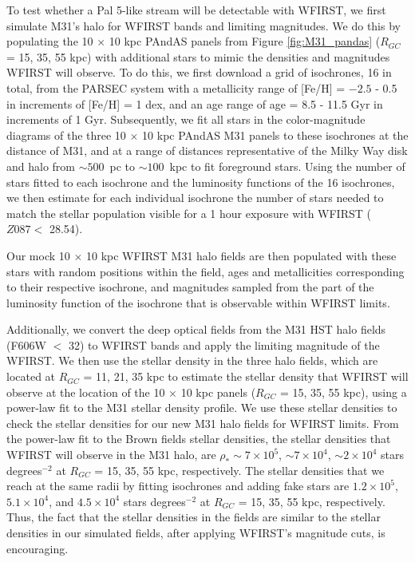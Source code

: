 \documentclass[twocolumn]{aastex62}
\begin{document}
To test whether a Pal 5-like stream will be detectable with WFIRST, we first simulate M31's halo for WFIRST bands and limiting magnitudes. We do this by populating the 10 $\times$ 10 kpc PAndAS panels from Figure \ref{fig:M31_pandas} ($R_{GC}$ = 15, 35, 55 kpc) with additional stars to mimic the densities and magnitudes WFIRST will observe. To do this, we first download a grid of isochrones, 16 in total, from the PARSEC system with a metallicity range of [Fe/H] = $-2.5$ - 0.5 in increments of [Fe/H] = 1 dex, and an age range of age = 8.5 - 11.5 Gyr in increments of 1 Gyr. Subsequently, we fit all stars in the color-magnitude diagrams of the three 10 $\times$ 10 kpc  PAndAS M31 panels to these isochrones at the distance of M31, and at a range of distances representative of the Milky Way disk and halo from ${\sim}500$~pc to ${\sim}100$~kpc to fit foreground stars. Using the number of stars fitted to each isochrone and the luminosity functions of the 16 isochrones, we then estimate  for each individual isochrone the number of stars needed to match the stellar population visible for a 1 hour exposure with WFIRST ($Z087 <$ 28.54).

Our mock 10 $\times$ 10 kpc WFIRST M31 halo fields are then populated with these stars with random positions within the field, ages and metallicities corresponding to their respective isochrone, and magnitudes sampled from the part of the luminosity function of the isochrone that is observable within WFIRST limits.

Additionally, we convert the deep optical fields from the \citet{brown09} M31 HST halo fields (F606W $<$ 32) to WFIRST bands and apply the limiting magnitude of the WFIRST. We then use the stellar density in the three \citet{brown09} halo fields, which are located at $R_{GC}$ = 11, 21, 35 kpc to estimate the stellar density that WFIRST will observe at the location of the 10 $\times$ 10 kpc panels ($R_{GC}$ = 15, 35, 55 kpc), using a power-law fit to the M31 stellar density profile. We use these stellar densities to check the stellar densities for our new M31 halo fields for WFIRST limits. From the power-law fit to the Brown fields stellar densities, the stellar densities that WFIRST will observe in the M31 halo, are $\rho_*  \sim 7 \times 10^5$,  ${\sim}7 \times 10^4$,  ${\sim} 2 \times 10^4$ stars degrees$^{-2}$ at  $R_{GC}$ = 15, 35, 55 kpc, respectively. The stellar densities that we reach at the same radii by fitting isochrones and adding fake stars are  $1.2 \times 10^5$, $5.1 \times 10^4$, and $4.5 \times 10^4$ stars degrees$^{-2}$ at  $R_{GC}$ = 15, 35, 55 kpc, respectively. Thus, the fact that the stellar densities in the \citet{brown09} fields are similar to the stellar densities in our simulated fields, after applying WFIRST's magnitude cuts, is encouraging. 
\end{document}
